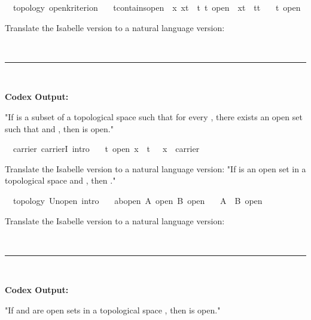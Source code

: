 \documentclass{article}
\begin{document}
\begin{boxB}
\begin{isabelle}
\isamarkupfalse \ {\isacharparenleft}{\kern0pt}\ topology{\isacharparenright}{\kern0pt}\ open{\isacharunderscore}{\kern0pt}kriterion{\isacharcolon}{\kern0pt}\isanewline
\ \ \ t{\isacharunderscore}{\kern0pt}contains{\isacharunderscore}{\kern0pt}open{\isacharcolon}{\kern0pt}\ {\isachardoublequoteopen}{\isasymAnd}\ x{\isachardot}{\kern0pt}\ x{\isasymin}t\ {\isasymLongrightarrow}\ {\isasymexists}t{\isacharprime}{\kern0pt}{\isachardot}{\kern0pt}\ t{\isacharprime}{\kern0pt}\ open\ {\isasymand}\ x{\isasymin}t{\isacharprime}{\kern0pt}\ {\isasymand}\ t{\isacharprime}{\kern0pt}{\isasymsubseteq}t{\isachardoublequoteclose}\isanewline
\ \ \ {\isachardoublequoteopen}t\ open{\isachardoublequoteclose}
\end{isabelle}
Translate the Isabelle version to a natural language version:

\
\hrule
\

\textbf{Codex Output:}

"If  is a subset of a topological space  such that for every , there exists an open set  such that  and , then  is open."
\end{boxB}

\begin{boxB}
\begin{isabelle}
 \isamarkupfalse \ {\isacharparenleft}{\kern0pt}\ carrier{\isacharparenright}{\kern0pt}\ carrierI\ {\isacharbrackleft}{\kern0pt}intro{\isacharbrackright}{\kern0pt}{\isacharcolon}{\kern0pt}\isanewline
\ \ {\isachardoublequoteopen}{\isasymlbrakk}\ t\ open{\isacharsemicolon}{\kern0pt}\ x\ {\isasymin}\ t\ {\isasymrbrakk}\ {\isasymLongrightarrow}\ x\ {\isasymin}\ carrier{\isachardoublequoteclose}
 \end{isabelle}
Translate the Isabelle version to a natural language version:
"If  is an open set in a topological space  and , then ."
\end{boxB}

\begin{boxB}
\begin{isabelle}
\isamarkupfalse \ {\isacharparenleft}{\kern0pt}\ topology{\isacharparenright}{\kern0pt}\ Un{\isacharunderscore}{\kern0pt}open\ {\isacharbrackleft}{\kern0pt}intro{\isacharbang}{\kern0pt}{\isacharbrackright}{\kern0pt}{\isacharcolon}{\kern0pt}\isanewline
\ \ \isakeyword{assumes}\ abopen{\isacharcolon}{\kern0pt}\ {\isachardoublequoteopen}A\ open{\isachardoublequoteclose}\ {\isachardoublequoteopen}B\ open{\isachardoublequoteclose}\isanewline
\ \ \isakeyword{shows}\ {\isachardoublequoteopen}A\ {\isasymunion}\ B\ open{\isachardoublequoteclose}
\end{isabelle}
Translate the Isabelle version to a natural language version:

\
\hrule
\

\textbf{Codex Output:}

"If  and  are open sets in a topological space , then  is open."
\end{boxB}
\end{document}
